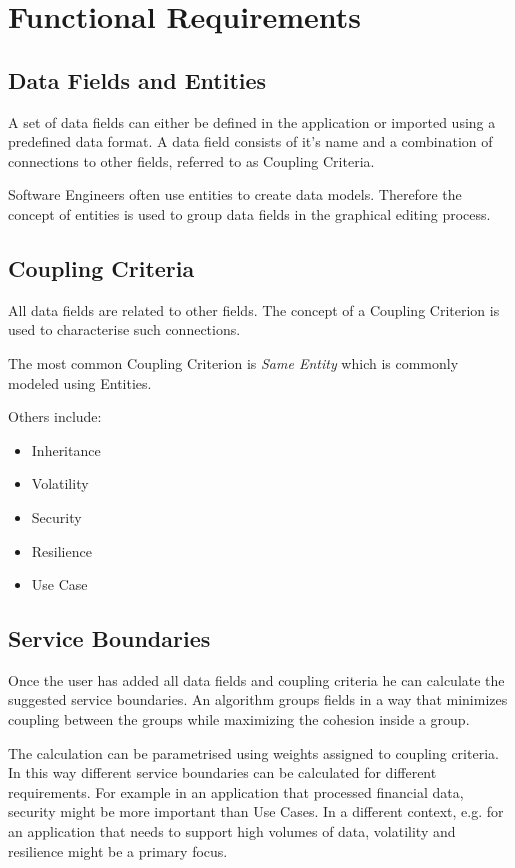 \section{Functional Requirements}


\subsection{Data Fields and Entities}

A set of data fields can either be defined in the application or imported using a predefined data format. A data field consists of it's name and a combination of connections to other fields, referred to as Coupling Criteria.

Software Engineers often use entities to create data models. Therefore the concept of entities is used to group data fields in the graphical editing process.

\subsection{Coupling Criteria}

All data fields are related to other fields. The concept of a Coupling Criterion is used to characterise such connections.

The most common Coupling Criterion is \textit{Same Entity} which is commonly modeled using Entities. %

Others include:

\begin{itemize}
	\item Inheritance
	\item Volatility
	\item Security
	\item Resilience
	\item Use Case
\end{itemize}


\subsection{Service Boundaries}

Once the user has added all data fields and coupling criteria he can calculate the suggested service boundaries. An algorithm groups fields in a way that minimizes coupling between the groups while maximizing the cohesion inside a group.

The calculation can be parametrised using weights assigned to coupling criteria. In this way different service boundaries can be calculated for different requirements. For example in an application that processed financial data, security might be more important than Use Cases. In a different context, e.g. for an application that needs to support high volumes of data, volatility and resilience might be a primary focus.